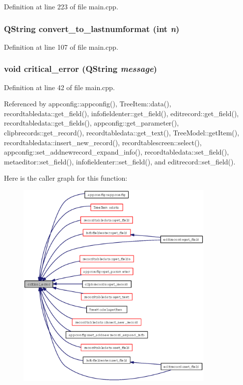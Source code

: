 Definition at line 223 of file main.cpp.
\subsubsection{\setlength{\rightskip}{0pt plus 5cm}QString convert\_\-to\_\-lastnumformat (int {\em n})}\label{main_8cpp_ec163ac31ec8c8183dc05762ecb4281d}




Definition at line 107 of file main.cpp.
\subsubsection{\setlength{\rightskip}{0pt plus 5cm}void critical\_\-error (QString {\em message})}\label{main_8cpp_fe5e42a76086b3d9d2912f0c17ef0e59}




Definition at line 42 of file main.cpp.

Referenced by appconfig::appconfig(), Tree\-Item::data(), recordtabledata::get\_\-field(), infofieldenter::get\_\-field(), editrecord::get\_\-field(), recordtabledata::get\_\-fields(), appconfig::get\_\-parameter(), clipbrecords::get\_\-record(), recordtabledata::get\_\-text(), Tree\-Model::get\-Item(), recordtabledata::insert\_\-new\_\-record(), recordtablescreen::select(), appconfig::set\_\-addnewrecord\_\-expand\_\-info(), recordtabledata::set\_\-field(), metaeditor::set\_\-field(), infofieldenter::set\_\-field(), and editrecord::set\_\-field().

Here is the caller graph for this function:\begin{figure}[H]
\begin{center}
\leavevmode
\includegraphics[width=275pt]{main_8cpp_fe5e42a76086b3d9d2912f0c17ef0e59_icgraph}
\end{center}
\end{figure}
